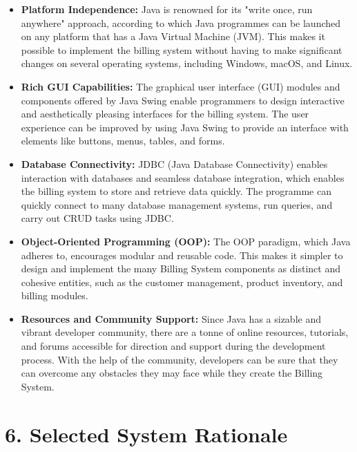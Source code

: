 \documentclass[12pt,letterpaper]{report}
\begin{document}
\begin{itemize}
    \item \textbf{Platform Independence: }Java is renowned for its "write once, run anywhere" approach, according to which Java programmes can be launched on any platform that has a Java Virtual Machine (JVM). This makes it possible to implement the billing system without having to make significant changes on several operating systems, including Windows, macOS, and Linux.

    \item \textbf{Rich GUI Capabilities: }The graphical user interface (GUI) modules and components offered by Java Swing enable programmers to design interactive and aesthetically pleasing interfaces for the billing system. The user experience can be improved by using Java Swing to provide an interface with elements like buttons, menus, tables, and forms.

    \item \textbf{Database Connectivity: }JDBC (Java Database Connectivity) enables interaction with databases and seamless database integration, which enables the billing system to store and retrieve data quickly. The programme can quickly connect to many database management systems, run queries, and carry out CRUD tasks using JDBC. 

    \item \textbf{Object-Oriented Programming (OOP): } The OOP paradigm, which Java adheres to, encourages modular and reusable code. This makes it simpler to design and implement the many Billing System components as distinct and cohesive entities, such as the customer management, product inventory, and billing modules. 

    \item \textbf{Resources and Community Support: }Since Java has a sizable and vibrant developer community, there are a tonne of online resources, tutorials, and forums accessible for direction and support during the development process. With the help of the community, developers can be sure that they can overcome any obstacles they may face while they create the Billing System.


\end{itemize}


\newpage
{}
\section*{6. Selected System Rationale}
\end{document}
